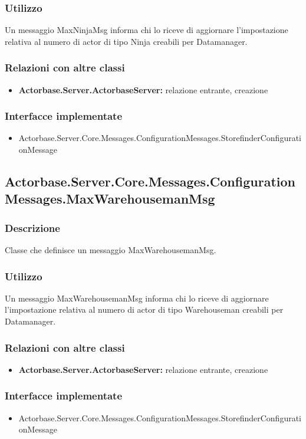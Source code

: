 \documentclass[a4paper]{article}
\begin{document}
			\subsubsection{Utilizzo}
				Un messaggio MaxNinjaMsg informa chi lo riceve di aggiornare l'impostazione relativa al numero di actor di tipo Ninja creabili per Datamanager.
			\subsubsection{Relazioni con altre classi}
			\begin{itemize}
				\item \textbf{Actorbase.Server.ActorbaseServer:} relazione entrante, creazione
			\end{itemize}
			\subsubsection{Interfacce implementate}
			\begin{itemize}
				\item Actorbase.Server.Core.Messages.ConfigurationMessages.StorefinderConfigurationMessage
			\end{itemize}

			\subsection{Actorbase.Server.Core.Messages.ConfigurationMessages.MaxWarehousemanMsg}
			\subsubsection{Descrizione}
				Classe che definisce un messaggio MaxWarehousemanMsg.
			\subsubsection{Utilizzo}
				Un messaggio MaxWarehousemanMsg informa chi lo riceve di aggiornare l'impostazione relativa al numero di actor di tipo Warehouseman creabili per Datamanager.
			\subsubsection{Relazioni con altre classi}
			\begin{itemize}
				\item \textbf{Actorbase.Server.ActorbaseServer:} relazione entrante, creazione
			\end{itemize}
			\subsubsection{Interfacce implementate}
			\begin{itemize}
				\item Actorbase.Server.Core.Messages.ConfigurationMessages.StorefinderConfigurationMessage
			\end{itemize}
\end{document}
